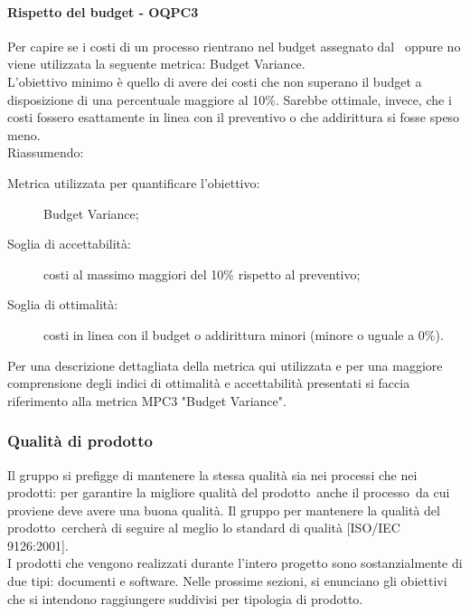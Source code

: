 \documentclass[../PianoDiQualifica.tex]{subfiles}
\begin{document}
		\paragraph{Rispetto del budget - OQPC3}
		Per capire se i costi di un processo rientrano nel budget assegnato dal \pianodiprogetto\ oppure no viene utilizzata la seguente metrica: Budget Variance.\\
		L’obiettivo minimo è quello di avere dei costi che non superano il budget a disposizione di una percentuale maggiore al 10\%. Sarebbe ottimale, invece, che i costi fossero esattamente in linea con il preventivo o che addirittura si fosse speso meno.\\
		Riassumendo:
		\begin{description}
			\item[Metrica utilizzata per quantificare l’obiettivo:] Budget Variance;
			\item[Soglia di accettabilità:] costi al massimo maggiori del 10\% rispetto al preventivo;
			\item[Soglia di ottimalità:] costi in linea con il budget o addirittura minori (minore o uguale a 0\%).
		\end{description}
		Per una descrizione dettagliata della metrica qui utilizzata e per una maggiore comprensione degli indici di ottimalità e accettabilità presentati si faccia riferimento alla metrica MPC3 "Budget Variance".
		
		\subsubsection{Qualità di prodotto}
		Il gruppo si prefigge di mantenere la stessa qualità sia nei processi che nei prodotti: per garantire la migliore qualità del prodotto\g\ anche il processo\g\ da cui proviene deve avere una buona qualità. Il gruppo per mantenere la qualità del prodotto\g\ 
cercherà di seguire al meglio lo standard di qualità [ISO/IEC 9126:2001].\\
		I prodotti che vengono realizzati durante l'intero progetto sono sostanzialmente di due tipi: documenti e software\g. Nelle prossime sezioni, si enunciano gli obiettivi che si intendono raggiungere suddivisi per tipologia di prodotto\g.
\end{document}
